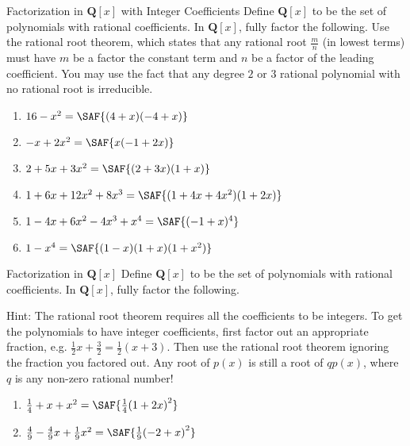 \documentclass[12pt,letterpaper]{article}
\begin{document}
\begin{problem}{Factorization in \(\mathbf{Q}[x]\) with Integer Coefficients}
  Define \(\mathbf{Q}[x]\) to be the set of polynomials with rational coefficients. In
  \(\mathbf{Q}[x]\), fully factor the following. Use the rational root theorem, which states
  that any rational root $\frac{m}{n}$ (in lowest terms) must have $m$ be a factor the
  constant term and $n$ be a factor of the leading coefficient. You may use the fact that
  any degree $2$ or $3$ rational polynomial with no rational root is irreducible.

  \begin{enumerate}
    \item \(16 - x^2 = \SAF{(4 + x)(-4 + x)}\)
    \item \(-x + 2x^2 = \SAF{x(-1 + 2x)}\)
    \item \(2 + 5x + 3x^2 = \SAF{(2 + 3x)(1 + x)}\)
    \item \(1 + 6x + 12x^2 + 8x^3 = \SAF{(1 + 4x + 4x^2)(1 + 2x)}\)
    \item \(1 - 4x + 6x^2 - 4x^3 + x^4 = \SAF{(-1 + x)^4}\)
    \item \(1 - x^4 = \SAF{(1 - x)(1 + x)(1 + x^2)}\)
  \end{enumerate}
\end{problem}

\begin{problem}{Factorization in \(\mathbf{Q}[x]\)}
  Define \(\mathbf{Q}[x]\) to be the set of polynomials with rational coefficients. In
  \(\mathbf{Q}[x]\), fully factor the following.

  \vspace{1em}
  \noindent
  Hint: The rational root theorem requires all the coefficients to be integers. To get the
  polynomials to have integer coefficients, first factor out an appropriate fraction, e.g.
  $\frac{1}{2}x + \frac{3}{2} = \frac{1}{2}(x + 3)$. Then use the rational root theorem
  ignoring the fraction you factored out. Any root of $p(x)$ is still a root of $q p(x)$,
  where $q$ is any non-zero rational number!

  \begin{enumerate}
    \item \(\frac{1}{4} + x + x^2 = \SAF{\frac{1}{4}{(1 + 2x)}^2}\)
    \item \(\frac{4}{9} - \frac{4}{9}x + \frac{1}{9}x^2 = \SAF{\frac{1}{9}{(-2 + x)}^2}\)
  \end{enumerate}
\end{problem}
\end{document}
